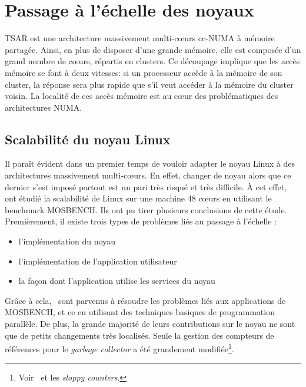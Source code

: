   
  \section{Passage à l’échelle des noyaux}
  \label{sec:scalability}

    TSAR est une architecture massivement multi-c\oe urs
    cc-NUMA à
    mémoire partagée. Ainsi, en plus de disposer d'une grande mémoire, elle est
    composée d'un grand nombre de c\oe urs, répartis en clusters. Ce découpage
    implique que les accès mémoire se font à deux vitesses: si un processeur
    accède à la mémoire de son cluster, la réponse sera plus rapide que s'il
    veut accéder à la mémoire du cluster voisin. La localité de ces accès
    mémoire est au c\oe ur des problématiques des architectures NUMA.


    \subsection{Scalabilité du noyau Linux}

      Il paraît évident dans un premier temps de vouloir adapter le noyau Linux
      à des architectures massivement multi-c\oe urs. En effet, changer de noyau
      alors que ce dernier s’est imposé partout est un pari très risqué et très
      difficile. À cet effet,~\citet{boyd2010analysis} ont étudié la scalabilité
      de Linux sur une machine 48 c\oe urs en utilisant le benchmark
      MOSBENCH. Ils ont pu tirer plusieurs conclusions de cette étude.
      Premièrement, il existe trois types de problèmes liés au passage à
      l’échelle :
      \begin{itemize}
        \item l’implémentation du noyau
        \item l’implémentation de l’application utilisateur
        \item la façon dont l’application utilise les services du noyau
      \end{itemize}
      Grâce à cela,~\citeauthor{boyd2010analysis} sont parvenus à résoudre les
      problèmes liés aux applications de MOSBENCH, et ce en utilisant des
      techniques basiques de programmation parallèle. De plus, la grande
      majorité de leurs contributions sur le noyau ne sont que de petits
      changements très localisés. Seule la gestion des compteurs de références
      pour le \textit{garbage collector} a été grandement
      modifiée\footnote{Voir~\citep{boyd2010analysis} et les \textit{sloppy
          counters}.}.

